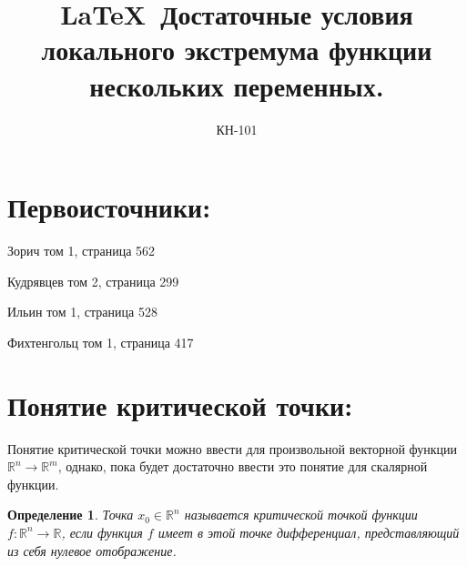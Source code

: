 \documentclass[20pt,a4paper]{extarticle}
\title{\LaTeX\ Достаточные условия локального экстремума функции нескольких переменных.}
\author{КН-101}
\newtheorem*{definition}{Определение}
\begin{document}
\maketitle

\section*{Первоисточники:}
\parindent=0cm
Зорич том 1, страница 562

Кудрявцев том 2, страница 299

Ильин том 1, страница 528

Фихтенгольц том 1, страница 417

\section*{Понятие критической точки:}

Понятие критической точки можно ввести для произвольной векторной функции $\mathbb{R}^n \to \mathbb{R}^m$, однако, пока будет достаточно ввести это понятие для скалярной функции. 

\begin{definition}
Точка $x_0 \in \mathbb{R}^n$ называется критической точкой функции $f: \mathbb{R}^n \to \mathbb{R}$, если функция $f$ имеет в этой точке дифференциал, представляющий из себя нулевое отображение.
\end{definition}
\end{document}
